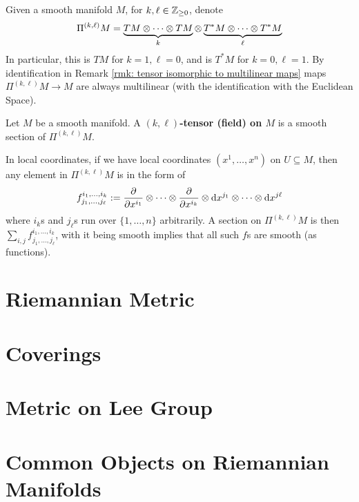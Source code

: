 \documentclass{article}
\begin{document}
\begin{notation}
    Given a smooth manifold $M$, for $k, \ell \in \mathbb{Z}_{\geq 0}$, denote
    \[
        \Pi^{(k, \ell)} M = \underbrace{TM \otimes \cdots \otimes TM}_{k} \otimes \underbrace{T^{\ast}M \otimes \cdots \otimes T^{\ast} M}_{\ell}
    \]
    In particular, this is $TM$ for $k = 1, \ell = 0$, and is $T^{\ast}M$ for $k = 0, \ell = 1$. By identification in Remark \ref{rmk: tensor isomorphic to multilinear maps} maps $\Pi^{(k, \ell)} M \to M$ are always multilinear (with the identification with the Euclidean Space). 
\end{notation}

\begin{definition}
    Let $M$ be a smooth manifold. A \textbf{$(k, \ell)$-tensor (field) on $M$} is a smooth section of $\Pi^{(k, \ell)} M$.
\end{definition}

In local coordinates, if we have local coordinates $(x^1, \dots, x^n)$ on $U \subseteq M$, then any element in $\Pi^{(k, \ell)} M$ is in the form of 
\[
    f_{j_1, \dots, j_{\ell}}^{i_1, \dots, i_k} := \frac{\partial}{\partial x^{i_1}} \otimes \cdots \otimes \frac{\partial}{\partial x^{i_k}} \otimes \mathrm{d} x^{j_1} \otimes \cdots \otimes \mathrm{d} x^{j \ell}
\]
where $i_k$s and $j_{\ell}$s run over $\{ 1, \dots, n \}$ arbitrarily. A section on $\Pi^{(k, \ell)} M$ is then $\sum_{i, j} f_{j_1, \dots, j_{\ell}}^{i_1, \dots, i_k}$, with it being smooth implies that all such $f$s are smooth (as functions).

\section{Riemannian Metric}

\section{Coverings}

\section{Metric on Lee Group}

\section{Common Objects on Riemannian Manifolds}
\end{document}
